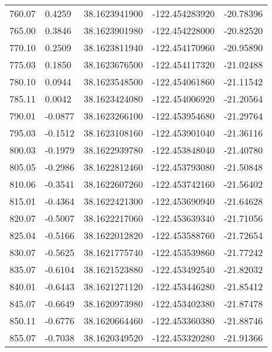 \begin{longtable}{p{2.5cm}p{2.5cm}p{3cm}p{3cm}p{2.5cm}}
       760.07  & 	 0.4259 &               38.1623941900  &   -122.454283920   &	-20.78396 \\
       765.00  & 	 0.3846 &               38.1623901980  &   -122.454228000   &	-20.82520 \\
       770.10  & 	 0.2509 &               38.1623811940  &   -122.454170960   &	-20.95890 \\
       775.03  & 	 0.1850 &               38.1623676500  &   -122.454117320   &	-21.02488 \\
       780.10  & 	 0.0944 &               38.1623548500  &   -122.454061860   &	-21.11542 \\
       785.11  & 	 0.0042 &               38.1623424080  &   -122.454006920   &	-21.20564 \\
       790.01  & 	-0.0877 &               38.1623266100  &   -122.453954680   &	-21.29764 \\
       795.03  & 	-0.1512 &               38.1623108160  &   -122.453901040   &	-21.36116 \\
       800.03  & 	-0.1979 &               38.1622939780  &   -122.453848040   &	-21.40780 \\
       805.05  & 	-0.2986 &               38.1622812460  &   -122.453793080   &	-21.50848 \\
       810.06  & 	-0.3541 &               38.1622607260  &   -122.453742160   &	-21.56402 \\
       815.01  & 	-0.4364 &               38.1622421300  &   -122.453690940   &	-21.64628 \\
       820.07  & 	-0.5007 &               38.1622217060  &   -122.453639340   &	-21.71056 \\
       825.04  & 	-0.5166 &               38.1622012820  &   -122.453588760   &	-21.72654 \\
       830.07  & 	-0.5625 &               38.1621775740  &   -122.453539860   &	-21.77242 \\
       835.07  & 	-0.6104 &               38.1621523880  &   -122.453492540   &	-21.82032 \\
       840.01  & 	-0.6443 &               38.1621271120  &   -122.453446280   &	-21.85412 \\
       845.07  & 	-0.6649 &               38.1620973980  &   -122.453402380   &	-21.87478 \\
       850.11  & 	-0.6776 &               38.1620664460  &   -122.453360380   &	-21.88746 \\
       855.07  & 	-0.7038 &               38.1620349520  &   -122.453320280   &	-21.91366 \\

\end{longtable}
